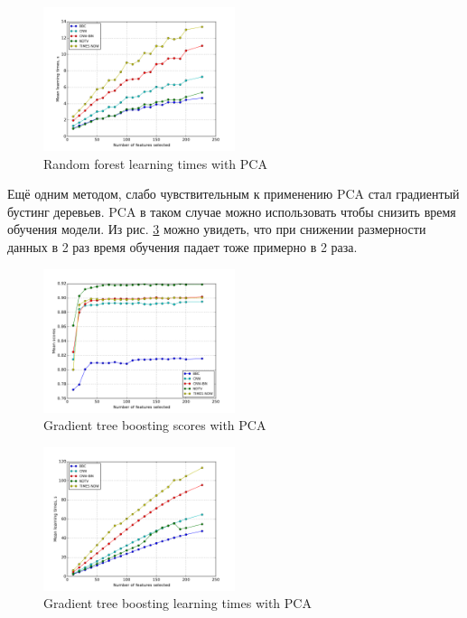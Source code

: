  \begin{figure}[h!]
    \centering
    \includegraphics[width=0.5\textwidth]{images/PCA-randforTime.png}
    \caption{Random forest learning times with PCA}
    \label{fig:randfor_pca_times}
\end{figure} 
  \par
  Ещё одним методом, слабо чувствительным к применению PCA стал градиентый бустинг деревьев. PCA в таком случае можно использовать чтобы снизить время обучения модели. Из рис. \ref{fig:gtb_pca_times} можно увидеть, что при снижении размерности данных в 2 раз время обучения падает тоже примерно в 2 раза.

\begin{figure}[h!]
    \centering
    \includegraphics[width=0.5\textwidth]{images/PCA-GTB.png}
    \caption{Gradient tree boosting scores with PCA}
    \label{fig:gtb_pca_scores}
\end{figure} 
 
 \begin{figure}[h!]
    \centering
    \includegraphics[width=0.5\textwidth]{images/PCA-GTBTime.png}
    \caption{Gradient tree boosting learning times with PCA}
    \label{fig:gtb_pca_times}
\end{figure}

